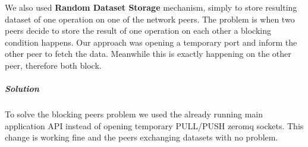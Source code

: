We also used \textbf{Random Dataset Storage} mechanism, simply to store resulting dataset of one operation on one of the network
peers. The problem is when two peers decide to store the result of one operation on each other a blocking condition happens. Our
approach was opening a temporary port and inform the other peer to fetch the data. 
Meanwhile this is exactly happening on the other peer, therefore both block.

\subparagraph{Solution}
To solve the blocking peers problem we used the already running main application API instead of 
opening temporary PULL/PUSH zeromq sockets. 
This change is working fine and the peers exchanging datasets with no problem.
\fi